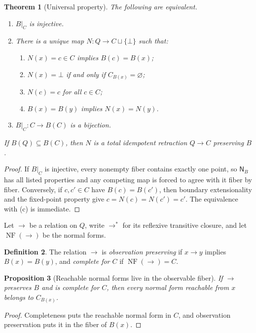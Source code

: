 \documentclass[11pt]{article}
\newtheorem{theorem}{Theorem}[section]
\newtheorem{proposition}[theorem]{Proposition}
\theoremstyle{definition}
\newtheorem{definition}[theorem]{Definition}
\theoremstyle{remark}
\numberwithin{equation}{section}
\newcommand{\NF}{\operatorname{NF}}
\begin{document}
\begin{theorem}[Universal property]\label{thm:universal}
The following are equivalent.
\begin{enumerate}[label=(\alph*)]
\item $B|_C$ is injective.
\item There is a unique map $N:Q\to C\sqcup\{\bot\}$ such that:
  \begin{enumerate}[label=(\roman*)]
  \item $N(x)=c\in C$ implies $B(c)=B(x)$;
  \item $N(x)=\bot$ if and only if $C_{B(x)}=\varnothing$;
  \item $N(c)=c$ for all $c\in C$;
  \item $B(x)=B(y)$ implies $N(x)=N(y)$.
  \end{enumerate}
\item $B|_C:C\to B(C)$ is a bijection.
\end{enumerate}
If $B(Q)\subseteq B(C)$, then $N$ is a total idempotent retraction $Q\to C$ preserving $B$.
\end{theorem}

\begin{proof}
If $B|_C$ is injective, every nonempty fiber contains exactly one point, so $\mathsf N_B$ has all listed properties and any competing map is forced to agree with it fiber by fiber.  Conversely, if $c,c'\in C$ have $B(c)=B(c')$, then boundary extensionality and the fixed-point property give $c=N(c)=N(c')=c'$.  The equivalence with (c) is immediate.
\end{proof}

Let $\to$ be a relation on $Q$, write $\to^*$ for its reflexive transitive closure, and let $\NF(\to)$ be the normal forms.

\begin{definition}
The relation $\to$ is \emph{observation preserving} if $x\to y$ implies $B(x)=B(y)$, and \emph{complete for $C$} if $\NF(\to)=C$.
\end{definition}

\begin{proposition}[Reachable normal forms live in the observable fiber]\label{prop:reachable-fiber}
If $\to$ preserves $B$ and is complete for $C$, then every normal form reachable from $x$ belongs to $C_{B(x)}$.
\end{proposition}

\begin{proof}
Completeness puts the reachable normal form in $C$, and observation preservation puts it in the fiber of $B(x)$.
\end{proof}
\end{document}
